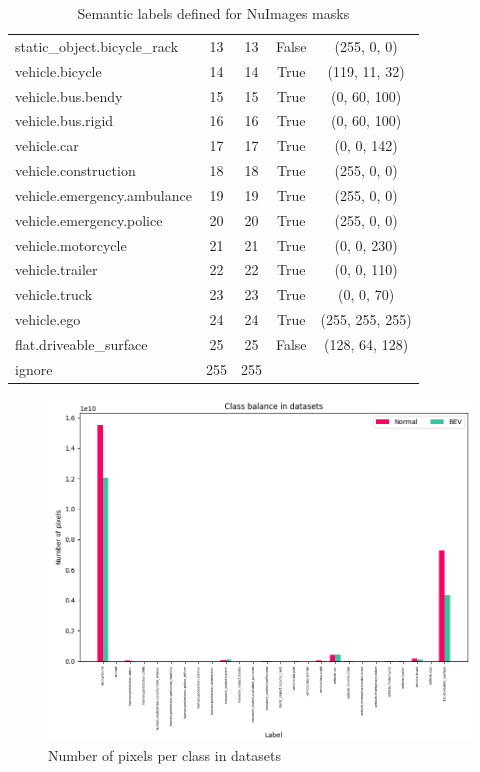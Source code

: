 \begin{table}[h]
\begin{tabular}{l c c c c}
        static\_object.bicycle\_rack        & 13 & 13 & False & (255, 0, 0) \\
        vehicle.bicycle                     & 14 & 14 & True  & (119, 11, 32) \\
        vehicle.bus.bendy                   & 15 & 15 & True  & (0, 60, 100) \\
        vehicle.bus.rigid                   & 16 & 16 & True  & (0, 60, 100) \\
        vehicle.car                         & 17 & 17 & True  & (0, 0, 142) \\
        vehicle.construction                & 18 & 18 & True  & (255, 0, 0) \\
        vehicle.emergency.ambulance         & 19 & 19 & True  & (255, 0, 0) \\
        vehicle.emergency.police            & 20 & 20 & True  & (255, 0, 0) \\
        vehicle.motorcycle                  & 21 & 21 & True  & (0, 0, 230) \\
        vehicle.trailer                     & 22 & 22 & True  & (0, 0, 110) \\
        vehicle.truck                       & 23 & 23 & True  & (0, 0, 70) \\
        vehicle.ego                         & 24 & 24 & True  & (255, 255, 255) \\
        flat.driveable\_surface             & 25 & 25 & False & (128, 64, 128) \\
        \midrule
        ignore                              & 255 & 255 &       &        \\
        \bottomrule
    \end{tabular}
    \caption{Semantic labels defined for NuImages masks}
    \label{tab:semantic_labels}
\end{table}

\begin{figure}[h!]
    \centering
    \includegraphics[width=\linewidth]{images/appendix/dataset_class_balance_pixels.png}
    \caption{Number of pixels per class in datasets}
    \label{fig:dataset_class_balance_pixels}
\end{figure}

